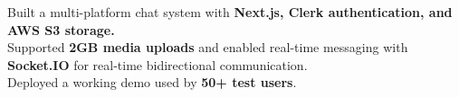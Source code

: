 \documentclass[]{Nikhil_Kadiyan_Resume}
\begin{document}
{}
\pt Built a multi-platform chat system with \textbf{Next.js, Clerk authentication, and AWS S3 storage.}\\
\pt Supported \textbf{2GB media uploads} and enabled real-time messaging with \textbf{Socket.IO} for real-time bidirectional communication.\\
\pt Deployed a working demo used by \textbf{50+ test users}.\\
\sectionsep

\end{document}
